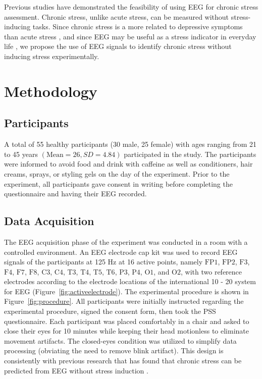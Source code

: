 \documentclass[pdflatex,sn-mathphys]{sn-jnl}%
\theoremstyle{thmstyleone}%
\theoremstyle{thmstyletwo}%
\theoremstyle{thmstylethree}%
\begin{document}
Previous studies have demonstrated the feasibility of using EEG for chronic stress assessment. Chronic stress, unlike acute stress, can be measured without stress-inducing tasks. Since chronic stress is a more related to depressive symptoms than acute stress \cite{McGonagle1990}, and since EEG may be useful as a stress indicator in everyday life \cite{Saeed2020}, we propose the use of EEG signals to identify chronic stress without inducing stress experimentally.

\section{Methodology}\label{sec3}

\subsection{Participants}\label{subsec1}
A total of 55 healthy participants (30 male, 25 female) with ages ranging from 21 to 45 years $(\text{Mean} = 26, SD = 4.84)$ participated in the study. The participants were informed to avoid food and drink with caffeine as well as conditioners, hair creams, sprays, or styling gels on the day of the experiment. Prior to the experiment, all participants gave consent in writing before completing the questionnaire and having their EEG recorded.

\subsection{Data Acquisition}\label{subsec2}
The EEG acquisition phase of the experiment was conducted in a room with a controlled environment. An EEG electrode cap kit was used to record EEG signals of the participants at 125 Hz at 16 active points, namely $\text{FP1}$, $\text{FP2}$, $\text{F3}$, $\text{F4}$, $\text{F7}$, $\text{F8}$, $\text{C3}$, $\text{C4}$, $\text{T3}$, $\text{T4}$, $\text{T5}$, $\text{T6}$, $\text{P3}$, $\text{P4}$, $\text{O1}$, and $\text{O2}$, with two reference electrodes according to the electrode locations of the international 10 - 20 system for EEG (Figure~\ref{fig:activeelectrode}). The experimental procedure is shown in Figure~\ref{fig:procedure}. All participants were initially instructed regarding the experimental procedure, signed the consent form, then took the PSS questionnaire. Each participant was placed comfortably in a chair and asked to close their eyes for 10 minutes while keeping their head motionless to eliminate movement artifacts. The closed-eyes condition was utilized to simplify data processing (obviating the need to remove blink artifact). This design is consistently with previous research that has found that chronic stress can be predicted from EEG without stress induction \cite{Khosrowabadi-2011, Peng-2012, Saeed2020}.
\end{document}
